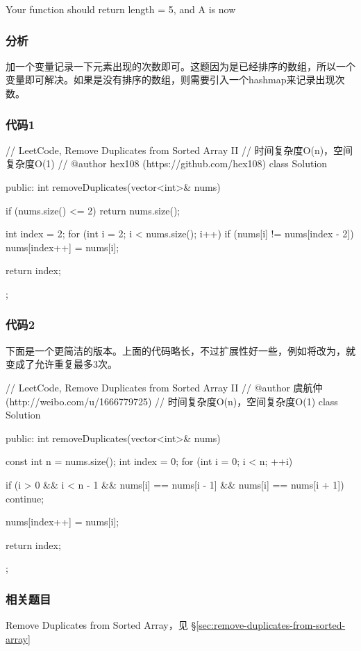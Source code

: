 Your function should return length = 5, and A is now \code{[1,1,2,2,3]}


\subsubsection{分析}
加一个变量记录一下元素出现的次数即可。这题因为是已经排序的数组，所以一个变量即可解决。如果是没有排序的数组，则需要引入一个hashmap来记录出现次数。


\subsubsection{代码1}
\begin{Code}
// LeetCode, Remove Duplicates from Sorted Array II
// 时间复杂度O(n)，空间复杂度O(1)
// @author hex108 (https://github.com/hex108)
class Solution {
public:
    int removeDuplicates(vector<int>& nums) {
        if (nums.size() <= 2) return nums.size();

        int index = 2;
        for (int i = 2; i < nums.size(); i++){
            if (nums[i] != nums[index - 2])
                nums[index++] = nums[i];
        }

        return index;
    }
};
\end{Code}


\subsubsection{代码2}
下面是一个更简洁的版本。上面的代码略长，不过扩展性好一些，例如将改为，就变成了允许重复最多3次。
\begin{Code}
// LeetCode, Remove Duplicates from Sorted Array II
// @author 虞航仲 (http://weibo.com/u/1666779725)
// 时间复杂度O(n)，空间复杂度O(1)
class Solution {
public:
    int removeDuplicates(vector<int>& nums) {
        const int n = nums.size();
        int index = 0;
        for (int i = 0; i < n; ++i) {
            if (i > 0 && i < n - 1 && nums[i] == nums[i - 1] && nums[i] == nums[i + 1])
                continue;

            nums[index++] = nums[i];
        }
        return index;
    }
};
\end{Code}


\subsubsection{相关题目}

\begindot
\item Remove Duplicates from Sorted Array，见 \S \ref{sec:remove-duplicates-from-sorted-array}
\myenddot


